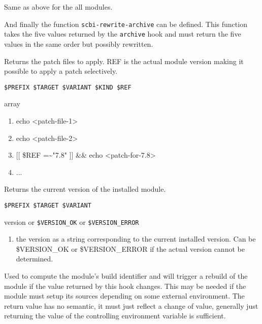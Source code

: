 \documentclass[a4paper,12pt,twoside]{article}
\newcommand{\code}[1]{\texttt{#1}}
\begin{document}
\begin{description}[font=\large\texttt]
\begin{description}[style=standard]
		\item[\code{SCBI\_ARCHIVE\_VARIANT}] Same as above for the all modules.
	\end{description}

	And finally the function \code{scbi-rewrite-archive} can be defined. This function takes the five values returned by the \code{archive} hook and must return the five values in the same order but possibly rewritten.

	\item[<module>{[}-common|<variant>{]}-patches] Returns the patch files to apply. REF is the actual module version making it possible to apply a patch selectively.

	\begin{description}[font=\textit,style=standard]
		\item[parameter] \tabto{2cm} \code{\$PREFIX \$TARGET \$VARIANT \$KIND \$REF}
		\item[return] \tabto{2cm} array
		\begin{enumerate}
			\item echo <patch-file-1>
			\item echo <patch-file-2>
			\item {[}{[} \$REF =\textasciitilde "7.8" {]}{]} \&\& echo <patch-for-7.8>
			\item ...
		\end{enumerate}
	\end{description}

	\item[<module>{[}-<variant>{]}-version] Returns the current version of the installed module.
	\begin{description}[font=\textit,style=standard]
		\item[parameter] \tabto{2cm} \code{\$PREFIX \$TARGET \$VARIANT}
		\item[return] \tabto{2cm} version or \code{\$VERSION\_OK} or \code{\$VERSION\_ERROR}
		\begin{enumerate}
			\item the version as a string corresponding to the current installed version. Can be \$VERSION\_OK or \$VERSION\_ERROR if the actual version cannot be determined.
		\end{enumerate}
	\end{description}

	\item[<module>{[}-common|<variant>{]}-external-env] Used to compute the module's build identifier and will trigger a rebuild of the module if the value returned by this hook changes. This may be needed if the module must setup its sources depending on some external environment. The return value has no semantic, it must just reflect a change of value, generally just returning the value of the controlling environment variable is sufficient.


\end{description}
\end{document}
